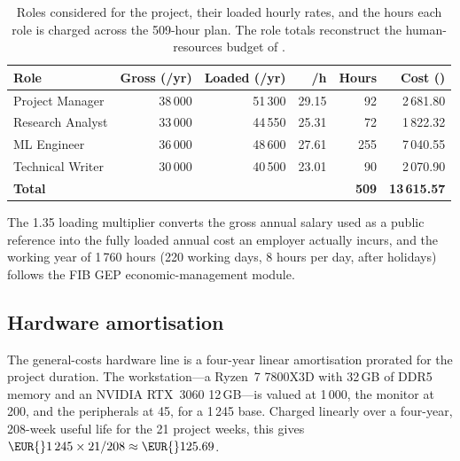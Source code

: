 \begin{table}[H]
    \centering
    \caption{Roles considered for the project, their loaded hourly
    rates, and the hours each role is charged across the 509-hour
    plan. The role totals reconstruct the human-resources budget of
    .}
    \label{tab:roles-cost}
    \small
    \setlength{\tabcolsep}{5pt}
    \renewcommand{\arraystretch}{1.35}
    \begin{tabularx}{\linewidth}{@{} L r r r r r @{}}
        \toprule
        \textbf{Role} & \textbf{Gross (\EUR{}/yr)} & \textbf{Loaded (\EUR{}/yr)} & \textbf{\EUR{}/h} & \textbf{Hours} & \textbf{Cost (\EUR{})} \\
        \midrule
        Project Manager   & 38\,000 & 51\,300 & 29.15 & 92  & 2\,681.80 \\ \tfgrowsep
        Research Analyst  & 33\,000 & 44\,550 & 25.31 & 72  & 1\,822.32 \\ \tfgrowsep
        ML Engineer       & 36\,000 & 48\,600 & 27.61 & 255 & 7\,040.55 \\ \tfgrowsep
        Technical Writer  & 30\,000 & 40\,500 & 23.01 & 90  & 2\,070.90 \\
        \midrule
        \textbf{Total}    &         &         &       & \textbf{509} & \textbf{13\,615.57} \\
        \bottomrule
    \end{tabularx}
\end{table}

The \num{1.35} loading multiplier converts the gross annual salary
used as a public reference into the fully loaded annual cost an
employer actually incurs, and the working year of 1\,760 hours
(220 working days, 8 hours per day, after holidays) follows the FIB
GEP economic-management module.

\subsection*{Hardware amortisation}

The general-costs hardware line is a four-year linear amortisation
prorated for the project duration.
The workstation---a Ryzen~7 7800X3D with 32\,GB of DDR5 memory and an
NVIDIA RTX~3060 12\,GB---is valued at \EUR{}1\,000, the monitor at
\EUR{}200, and the peripherals at \EUR{}45, for a \EUR{}1\,245 base.
Charged linearly over a four-year, \num{208}-week useful life for the
21 project weeks, this gives
$\EUR{}1\,245\times 21/208 \approx \EUR{}125.69$.
